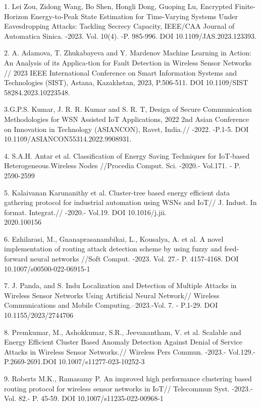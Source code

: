 \begin{noparindent}

1. Lei Zou, Zidong Wang, Bo Shen, Hongli Dong, Guoping Lu, Encrypted
Finite-Horizon Energy-to-Peak State Estimation for Time-Varying Systems
Under Eavesdropping Attacks: Tackling Secrecy Capacity, IEEE/CAA Journal
of Automatica Sinica. -2023. Vol. 10(4). -P. 985-996. DOI 10.1109/JAS.2023.123393.

2. A. Adamova, T. Zhukabayeva and Y. Mardenov Machine Learning in
Action: An Analysis of its Applica-tion for Fault Detection in Wireless
Sensor Networks // 2023 IEEE International Conference on Smart
Information Systems and Technologies (SIST), Astana, Kazakhstan, 2023,
P.506-511. DOI 10.1109/SIST\\58284.2023.10223548.

3.G.P.S. Kumar, J. R. R. Kumar and S. R. T, Design of Secure
Communication Methodologies for WSN Assisted IoT Applications, 2022 2nd
Asian Conference on Innovation in Technology (ASIANCON), Ravet, India.//
-2022. -P.1-5. DOI 10.1109/ASIANCON55314.2022.9908931.

4. S.A.H. Antar et al. Classification of Energy Saving Techniques for
IoT-based Heterogeneous.Wireless Nodes //Procedia Comput. Sci. -2020.-
Vol.171. - P. 2590-2599

5. Kalaivanan Karunanithy et al. Cluster-tree based energy efficient
data gathering protocol for industrial automation using WSNs and IoT//
J. Indust. In format. Integrat.// -2020.- Vol.19. DOI 10.1016/j.jii.\\2020.100156

6. Ezhilarasi, M., Gnanaprasanambikai, L., Kousalya, A. et al. A novel
implementation of routing attack detection scheme by using fuzzy and
feed-forward neural networks //Soft Comput. -2023. Vol. 27.- P.
4157-4168. DOI 10.1007/s00500-022-06915-1

7. J. Panda, and S. Indu Localization and Detection of Multiple Attacks
in Wireless Sensor Networks Using Artificial Neural Network// Wireless
Communications and Mobile Computing.--2023.-Vol. 7. - P.1-29. DOI 10.1155/2023/2744706

8. Premkumar, M., Ashokkumar, S.R., Jeevanantham, V. et al. Scalable and
Energy Efficient Cluster Based Anomaly Detection Against Denial of
Service Attacks in Wireless Sensor Networks.// Wireless Pers Commun.
-2023.- Vol.129.- P.2669-2691.DOI 10.1007/s11277-023-10252-3

9. Roberts M.K., Ramasamy P. An improved high performance clustering
based routing protocol for wireless sensor networks in IoT// Telecommun
Syst. -2023.- Vol. 82.- P. 45-59. DOI 10.1007/s11235-022-00968-1


\end{noparindent}

